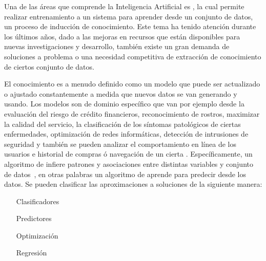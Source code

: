 

Una de las áreas que comprende la Inteligencia Artificial es \machinelearning, la cual permite realizar entrenamiento a un sistema para aprender desde un conjunto de datos, un proceso de inducción de conocimiento. Este tema ha tenido atención durante los últimos años, dado a las mejoras en recursos \cloudcomputing que están disponibles para nuevas investigaciones y desarrollo, también existe un gran demanda de soluciones a problema o una necesidad competitiva de extracción de conocimiento de ciertos conjunto de datos.

El conocimiento es a menudo definido como un modelo que puede ser actualizado o ajustado constantemente a medida que nuevos datos se van generando y usando. Los modelos son  de dominio específico que van por ejemplo desde la evaluación del riesgo de crédito financieros, reconocimiento de rostros, maximizar la calidad del servicio, la clasificación de los síntomas patológicos de ciertas enfermedades, optimización de redes informáticas, detección de intrusiones de seguridad y también se pueden analizar el comportamiento en línea de los usuarios e historial de compras ó navegación  de un cierta \webs. Específicamente, un algoritmo de \machinelearning infiere patrones y asociaciones entre distintas variables y conjunto de datos~\cite{guller2015big}, en otras palabras un algoritmo de \machinelearning aprende para predecir desde los datos. Se pueden clasificar las aproximaciones a soluciones de la siguiente manera:

\begin{itemize}
	
	\item[Clasificadores]	
		

	\item[Predictores]		
		

	\item[Optimización]	
		

	\item[Regresión]
		

\end{itemize}

